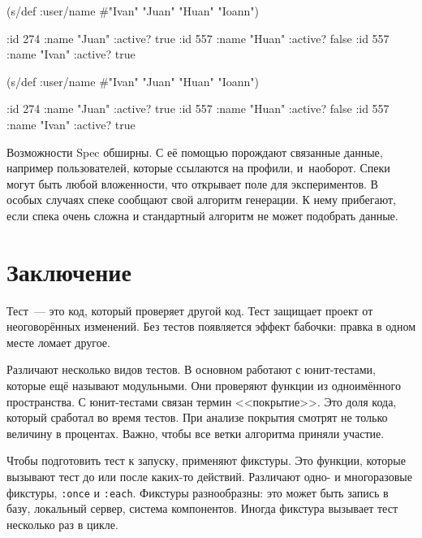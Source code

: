 \begin{english}
  \begin{clojure}
(s/def :user/name
  #{"Ivan" "Juan" "Huan" "Ioann"})

{:id 274 :name "Juan" :active? true}
{:id 557 :name "Huan" :active? false}
{:id 557 :name "Ivan" :active? true}
  \end{clojure}
\end{english}

\else

\begin{english}
  \begin{clojure}
(s/def :user/name #{"Ivan" "Juan" "Huan" "Ioann"})

{:id 274 :name "Juan" :active? true}
{:id 557 :name "Huan" :active? false}
{:id 557 :name "Ivan" :active? true}
  \end{clojure}
\end{english}

\fi

Возможности Spec обширны. С её помощью порождают связанные данные, например
пользователей, которые ссылаются на профили, и~наоборот. Спеки могут быть любой
вложенности, что открывает поле для экспериментов. В особых случаях спеке
сообщают свой алгоритм генерации. К нему прибегают, если спека очень сложна и
стандартный алгоритм не может подобрать данные.

\section{Заключение}

Тест~--- это код, который проверяет другой код. Тест защищает проект от
неоговорённых изменений. Без тестов появляется эффект бабочки: правка в одном
месте ломает другое.


Различают несколько видов тестов. В основном работают с юнит-тестами, которые
ещё называют модульными. Они проверяют функции из одноимённого пространства. С
юнит-тестами связан термин <<покрытие>>. Это доля кода, который сработал во
время тестов. При анализе покрытия смотрят не только величину в
процентах. Важно, чтобы все ветки алгоритма приняли участие.

Чтобы подготовить тест к запуску, применяют фикстуры. Это функции, которые
вызывают тест до или после каких-то действий. Различают одно- и многоразовые
фикстуры, \verb|:once| и \verb|:each|. Фикстуры разнообразны: это может быть
запись в базу, локальный сервер, система компонентов. Иногда фикстура вызывает
тест несколько раз в цикле.

